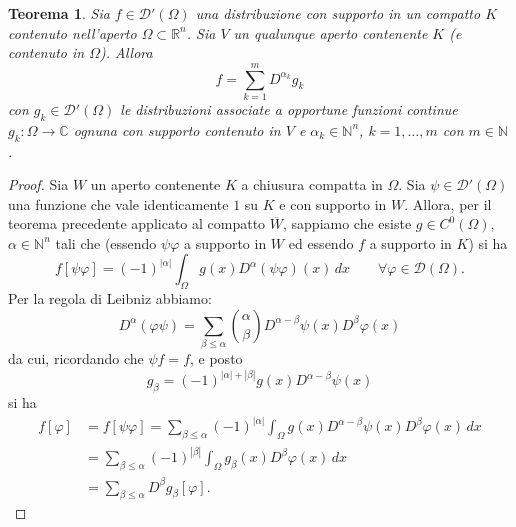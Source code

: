\documentclass[italian,a4paper,oneside,headinclude]{scrbook}
\renewcommand{\phi}{\varphi}
\newcommand{\D}{\mathcal D}
\newcommand{\CC}{\mathbb C}
\newcommand{\NN}{\mathbb N}
\newcommand{\RR}{\mathbb R}
\newcommand{\abs}[1]{{\left|#1\right|}}
\newtheorem{theorem}{Teorema}
\begin{document}
\begin{theorem}
  Sia $f\in \D'(\Omega)$ una distribuzione
  con supporto in un compatto $K$ contenuto nell'aperto $\Omega\subset \RR^n$.
  Sia $V$ un qualunque aperto contenente $K$ (e
  contenuto in $\Omega$). Allora
  \[
  f = \sum_{k=1}^m D^{\alpha_k} g_k
  \]
  con $g_k\in \D'(\Omega)$ le distribuzioni associate a opportune
  funzioni continue $g_k\colon \Omega\to \CC$ ognuna con supporto
  contenuto in $V$ e $\alpha_k\in \NN^n$, $k=1,\dots,m$ con $m\in \NN$.
\end{theorem}
%
\begin{proof}
  Sia $W$ un aperto contenente $K$ a chiusura compatta in $\Omega$.
  Sia $\psi\in \D'(\Omega)$ una funzione che vale identicamente $1$ su
  $K$ e con supporto in $W$. Allora, per il teorema precedente
  applicato al compatto $\overline W$, sappiamo che esiste
  $g\in C^0(\Omega)$, $\alpha \in \NN^n$ tali che (essendo $\psi\phi$
  a supporto in $W$ ed essendo $f$ a supporto in $K$) si ha
  \[
  f[\psi\phi] = (-1)^{\abs{\alpha}}\int_\Omega g(x) D^\alpha (\psi\phi)(x)\, dx
  \qquad \forall \phi\in\D(\Omega).
  \]
  Per la regola di Leibniz abbiamo:
  \[
    D^\alpha(\phi\psi) = \sum_{\beta\le\alpha}{\alpha \choose \beta}
    D^{\alpha-\beta} \psi(x) D^\beta \phi(x)
  \]
  da cui, ricordando che $\psi f = f$, e posto
  \[
    g_\beta = (-1)^{\abs{\alpha}+\abs{\beta}} g(x) D^{\alpha-\beta}\psi(x)
  \]
  si ha
  \begin{align*}
  f[\phi] &= f[\psi\phi] = \sum_{\beta\le \alpha}(-1)^{\abs\alpha}
  \int_\Omega g(x)D^{\alpha-\beta}\psi(x) D^\beta\phi(x)\, dx \\
  &= \sum_{\beta\le\alpha} (-1)^{\abs\beta} \int_\Omega g_\beta(x)
  D^\beta\phi(x) \, dx \\
  &= \sum_{\beta\le\alpha} D^\beta g_\beta[\phi].
  \end{align*}
 \end{proof}
\end{document}
